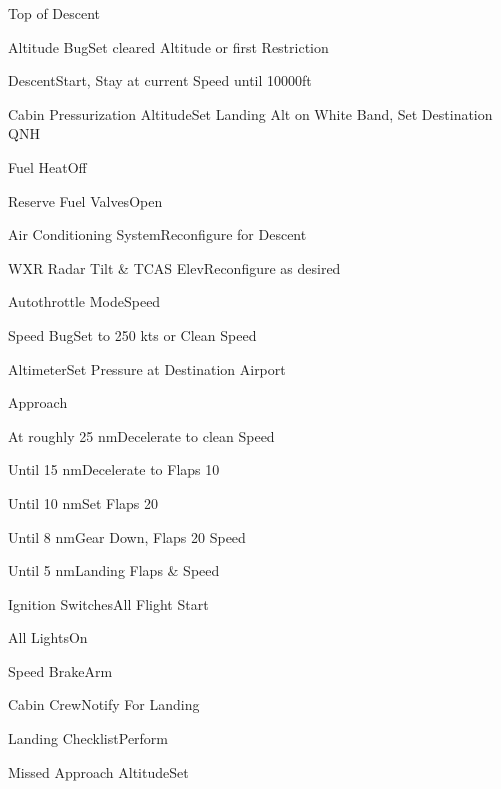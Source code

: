 \documentclass[sim-use, blue_items]{checklist}
\begin{document}
\begin{checklist}{Top of Descent}
	\item{Altitude Bug}{Set cleared Altitude or first Restriction}
	\item{Descent}{Start, Stay at current Speed until 10000ft}
	\item{Cabin Pressurization Altitude}{Set Landing Alt on White Band, Set Destination QNH}
	\item{Fuel Heat}{Off}
	\item{Reserve Fuel Valves}{Open}
	\item{Air Conditioning System}{Reconfigure for Descent}
	\item{WXR Radar Tilt \& TCAS Elev}{Reconfigure as desired}
	 {
		\item{Autothrottle Mode}{Speed}
		\item{Speed Bug}{Set to 250 kts or Clean Speed}
	}
	 {
		\item{Altimeter}{Set Pressure at Destination Airport}
	}
\end{checklist}

\begin{checklist}{Approach}
	\item{At roughly 25 nm}{Decelerate to clean Speed}
	\item{Until 15 nm}{Decelerate to Flaps 10}
	\item{Until 10 nm}{Set Flaps 20}
	\item{Until 8 nm}{Gear Down, Flaps 20 Speed}
	\item{Until 5 nm}{Landing Flaps \& Speed}
	\item{Ignition Switches}{All Flight Start}
	\item{All Lights}{On}
	\item{Speed Brake}{Arm}
	\item{Cabin Crew}{Notify For Landing}
	\item{Landing Checklist}{Perform}
	 {
		\item{Missed Approach Altitude}{Set}
	}
\end{checklist}
\end{document}
